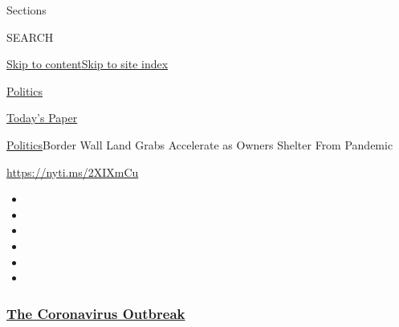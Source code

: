 Sections

SEARCH

\protect\hyperlink{site-content}{Skip to
content}\protect\hyperlink{site-index}{Skip to site index}

\href{https://www.nytimes3xbfgragh.onion/section/politics}{Politics}

\href{https://myaccount.nytimes3xbfgragh.onion/auth/login?response_type=cookie\&client_id=vi}{}

\href{https://www.nytimes3xbfgragh.onion/section/todayspaper}{Today's
Paper}

\href{/section/politics}{Politics}\textbar{}Border Wall Land Grabs
Accelerate as Owners Shelter From Pandemic

\url{https://nyti.ms/2XIXmCu}

\begin{itemize}
\item
\item
\item
\item
\item
\item
\end{itemize}

\hypertarget{the-coronavirus-outbreak}{%
\subsubsection{\texorpdfstring{\href{https://www.nytimes3xbfgragh.onion/news-event/coronavirus?name=styln-coronavirus-national\&region=TOP_BANNER\&block=storyline_menu_recirc\&action=click\&pgtype=Article\&impression_id=79168eb0-f4b9-11ea-b51e-55332169c079\&variant=undefined}{The
Coronavirus
Outbreak}}{The Coronavirus Outbreak}}\label{the-coronavirus-outbreak}}

